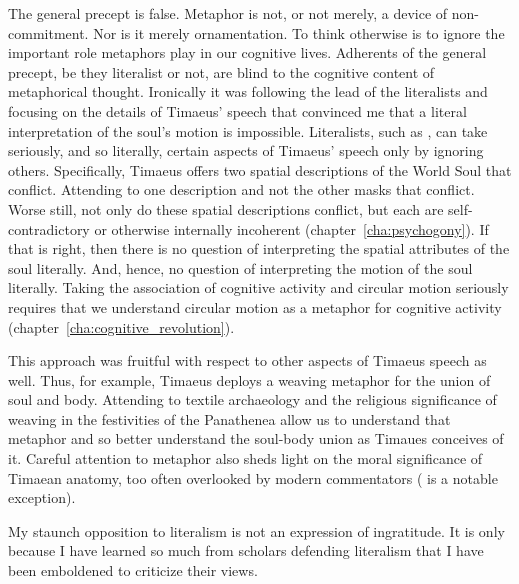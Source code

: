 The general precept is false. Metaphor is not, or not merely, a device of non-commit\-ment. Nor is it merely ornamentation. To think otherwise is to ignore the important role metaphors play in our cognitive lives. Adherents of the general precept, be they literalist or not, are blind to the cognitive content of metaphorical thought. Ironically it was following the lead of the literalists and focusing on the details of Timaeus' speech that convinced me that a literal interpretation of the soul's motion is impossible. Literalists, such as \citet{Sedley:1997kr}, can take seriously, and so literally, certain aspects of Timaeus' speech only by ignoring others. Specifically, Timaeus offers two spatial descriptions of the World Soul that conflict. Attending to one description and not the other masks that conflict. Worse still, not only do these spatial descriptions conflict, but each are self-contradictory or otherwise internally incoherent (chapter~\ref{cha:psychogony}). If that is right, then there is no question of interpreting the spatial attributes of the soul literally. And, hence, no question of interpreting the motion of the soul literally. Taking the association of cognitive activity and circular motion seriously requires that we understand circular motion as a metaphor for cognitive activity (chapter~\ref{cha:cognitive_revolution}). 

This approach was fruitful with respect to other aspects of Timaeus speech as well. Thus, for example, Timaeus deploys a weaving metaphor for the union of soul and body. Attending to textile archaeology and the religious significance of weaving in the festivities of the Panathenea allow us to understand that metaphor and so better understand the soul-body union as Timaues conceives of it. Careful attention to metaphor also sheds light on the moral significance of Timaean anatomy, too often overlooked by modern commentators (\citealt{Steel:2001ay} is a notable exception).

My staunch opposition to literalism is not an expression of ingratitude. It is only because I have learned so much from scholars defending literalism that I have been emboldened to criticize their views.



